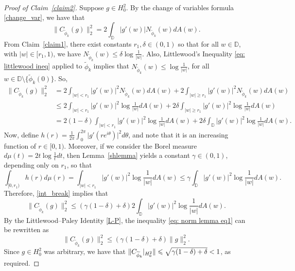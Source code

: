 \documentclass[11pt, reqno]{amsart}
\theoremstyle{definition}
\numberwithin{equation}{section}
\newcommand{\D}{\mathbb{D}}
\renewcommand{\geq}{\geqslant}
\renewcommand{\leq}{\leqslant}
\begin{document}
\begin{proof}[Proof of Claim~\ref{claim2}]
Suppose $g\in H_0^2$. By the change of variables formula \eqref{change_var}, we have that
\[
\lVert C_{\widetilde{\phi}_k}(g) \rVert_2^2 = 2\int_{\D} \lvert g'(w) \rvert N_{\widetilde{\phi}_k}(w)d A(w).
\]
From Claim~\ref{claim1}, there exist constants $r_1,\delta\in(0,1)$ so that for all $w\in \D$, with $\lvert w \rvert\in[r_1,1)$, we have $N_{\widetilde{\phi}_k}(w)\leq \delta\log\frac{1}{\lvert w \rvert}$. Also, Littlewood's Inequality \eqref{eq: littlewood ineq} applied to $\widetilde{\phi}_k$ implies that $N_{\widetilde{\phi}_k}(w)\leq \log\frac{1}{\lvert w\rvert}$, for all $w\in\D\setminus\{\widetilde{\phi}_k(0)\}$. So,
\begin{align}
\lVert C_{\widetilde{\phi}_k}(g) \rVert_2^2 &= 2 \int_{\lvert w \rvert< r_1}\lvert g'(w)\rvert^2 N_{\widetilde{\phi}_k}(w)dA(w) + 2\int_{\lvert w \rvert\geq r_1}\lvert g'(w)\rvert^2 N_{\widetilde{\phi}_k}(w)dA(w)\nonumber \\
	&\leq 2 \int_{\lvert w \rvert< r_1}\lvert g'(w)\rvert^2 \log\frac{1}{\lvert w \rvert} dA(w) + 2\delta \int_{\lvert w \rvert\geq r_1}\lvert g'(w)\rvert^2 \log\frac{1}{\lvert w \rvert}dA(w)\nonumber\\
	&=2(1-\delta) \int_{\lvert w \rvert< r_1}\lvert g'(w)\rvert^2 \log\frac{1}{\lvert w \rvert} dA(w) + 2\delta \int_{\D}\lvert g'(w)\rvert^2 \log\frac{1}{\lvert w \rvert}dA(w).\label{int_break}
\end{align}
Now, define $h(r)=\frac{1}{2\pi}\int_0^{2\pi}\lvert g'(re^{i\theta})\rvert^2 d\theta$, and note that it is an increasing function of $r\in[0,1)$. Moreover, if we consider the Borel measure $d\mu(t)=2t\log\frac{1}{t}dt$, then Lemma~\ref{shlemma} yields a constant $\gamma\in(0,1)$, depending only on $r_1$, so that
\[
\int_{[0,r_1)}h(r)d\mu(r)=\int_{\lvert w \rvert<r_1}\lvert g'(w) \rvert^2\log\frac{1}{\lvert w \rvert}d A(w)\leq \gamma \int_{\D} \lvert g'(w) \rvert^2\log\frac{1}{\lvert w \rvert}d A(w).
\]
Therefore, \eqref{int_break} implies that
\begin{equation}\label{eq: norm lemma eq1}
\lVert C_{\widetilde{\phi}_k}(g) \rVert_2^2 \leq (\gamma(1-\delta)+\delta) 2\int_{\D} \lvert g'(w) \rvert^2\log\frac{1}{\lvert w \rvert}d A(w).
\end{equation}
By the Littlewood--Paley Identity \eqref{L-P}, the inequality \eqref{eq: norm lemma eq1} can be rewritten as 
\[
\lVert C_{\widetilde{\phi}_k}(g) \rVert_2^2 \leq (\gamma(1-\delta)+\delta)\lVert g \rVert_2^2.
\]
Since $g\in H_0^2$ was arbitrary, we have that $\lVert C_{\widetilde{\phi}_k}\arrowvert_{H_0^2} \rVert\leq \sqrt{\gamma(1-\delta)+\delta} <1$, as required.
\end{proof}
\end{document}

